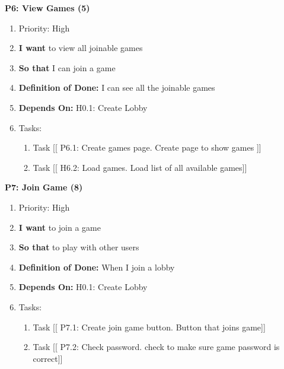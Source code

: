 \textbf{P6: View Games (5)}
\begin{enumerate}
    \item Priority: High
    \item \textbf{I want} to view all joinable games
    \item \textbf{So that} I can join a game
    \item \textbf{Definition of Done:} I can see all the joinable games
    \item \textbf{Depends On:} H0.1: Create Lobby
    \item Tasks:
    \begin{enumerate}
        \item Task [[ P6.1: Create games page. Create page to show games ]]
        \item Task [[ H6.2: Load games. Load list of all available games]]
    \end{enumerate}
\end{enumerate}

\vspace{2em}

\textbf{P7: Join Game (8)}
\begin{enumerate}
    \item Priority: High
    \item \textbf{I want} to join a game
    \item \textbf{So that} to play with other users
    \item \textbf{Definition of Done:} When I join a lobby
    \item \textbf{Depends On:} H0.1: Create Lobby
    \item Tasks:
    \begin{enumerate}
        \item Task [[ P7.1: Create join game button. Button that joins game]]
        \item Task [[ P7.2: Check password. check to make sure game password is correct]]
    \end{enumerate}
\end{enumerate}

\vspace{2em}

